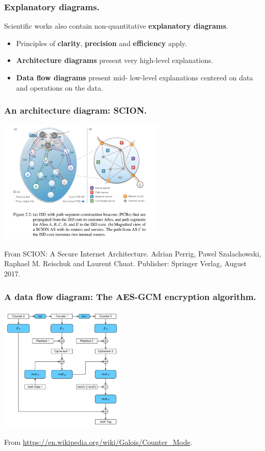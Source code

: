 \documentclass{beamer} %
\newcommand\emc[1]{\textcolor{brightblue}{\textbf{#1}}}
\begin{document}
\begin{frame}

\frametitle{Explanatory diagrams.}

Scientific works also contain non-quantitative \emc{explanatory diagrams}.

\vspace{5mm}
\begin{itemize}
\item Principles of \emc{clarity}, \emc{precision} and \emc{efficiency} apply. 
\item \emc{Architecture diagrams} present very high-level explanations.
\item \emc{Data flow diagrams} present mid- low-level explanations centered on data and operations on the data.
\end{itemize}


\end{frame}

\begin{frame}

\frametitle{An architecture diagram: SCION.}

\begin{center}
\includegraphics[width=8cm]{assets/scion}
\end{center}

\tiny From SCION: A Secure Internet Architecture. 
Adrian Perrig, Pawel Szalachowski, Raphael M. Reischuk and Laurent Chuat.
Publisher: Springer Verlag, August 2017.
\end{frame}

\begin{frame}

\frametitle{A data flow diagram: The AES-GCM encryption algorithm.}

\begin{center}
\includegraphics[width=6cm]{assets/GCM-Galois_Counter_Mode}
\end{center}

\tiny From \url{https://en.wikipedia.org/wiki/Galois/Counter_Mode}.
\end{frame}
\end{document}
